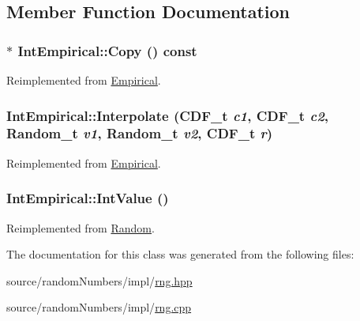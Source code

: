 \subsection{Member Function Documentation}
\hypertarget{classIntEmpirical_d7e809689f9158c050b8a386eb945636}{
\subsubsection[{Copy}]{ $\ast$ IntEmpirical::Copy () const}}
\label{classIntEmpirical_d7e809689f9158c050b8a386eb945636}




Reimplemented from \hyperlink{classEmpirical_d5429fdf863d53d74649cc8c630cfb0b}{Empirical}.\hypertarget{classIntEmpirical_9137a26418bfb0f912468c034ad1a8e0}{
\subsubsection[{Interpolate}]{ IntEmpirical::Interpolate ({\bf CDF\_\-t} {\em c1}, \/  {\bf CDF\_\-t} {\em c2}, \/  {\bf Random\_\-t} {\em v1}, \/  {\bf Random\_\-t} {\em v2}, \/  {\bf CDF\_\-t} {\em r})}}
\label{classIntEmpirical_9137a26418bfb0f912468c034ad1a8e0}




Reimplemented from \hyperlink{classEmpirical}{Empirical}.\hypertarget{classIntEmpirical_71e5695d2c4b6b6a853cbb2992f81d48}{
\subsubsection[{IntValue}]{ IntEmpirical::IntValue ()}}
\label{classIntEmpirical_71e5695d2c4b6b6a853cbb2992f81d48}




Reimplemented from \hyperlink{classRandom_9ac522e9fe39aefd2cddd88554184b1a}{Random}.

The documentation for this class was generated from the following files:\begin{CompactItemize}
\item 
source/randomNumbers/impl/\hyperlink{rng_8hpp}{rng.hpp}\item 
source/randomNumbers/impl/\hyperlink{rng_8cpp}{rng.cpp}\end{CompactItemize}
